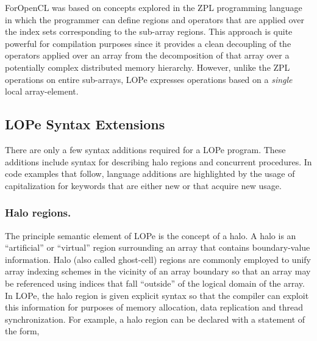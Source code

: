 ForOpenCL was based on concepts explored in the ZPL programming language~\cite{chamberlain04zpl} in
which the programmer can define regions and operators that are applied over the index sets
corresponding to the sub-array regions.  This approach is quite powerful for
compilation purposes since it provides a clean decoupling of the operators applied over an array
from the decomposition of that array over a potentially complex distributed memory hierarchy.
However, unlike the ZPL operations on entire sub-arrays, LOPe expresses operations based on
a \emph{single} local array-element.

%
%


\subsection{LOPe Syntax Extensions}

There are only a few syntax additions required for a LOPe program.
These additions include syntax for describing halo regions and
concurrent procedures.  In code examples that follow,
language additions are highlighted by the usage of capitalization for
keywords that are either new or that acquire new usage.

\subsubsection{Halo regions.}
The principle semantic element of LOPe is the concept of a halo.
A halo is an ``artificial'' or ``virtual'' region surrounding
an array that contains boundary-value information.  Halo (also called
ghost-cell) regions are commonly employed to unify array indexing
schemes in the vicinity of an array boundary so that an array may be
referenced using indices that fall ``outside'' of the logical domain
of the array.  In LOPe, the halo region is given explicit syntax so
that the compiler can exploit this information for purposes of memory
allocation, data replication and thread synchronization.  For example,
a halo region can be declared with a statement of the form,

